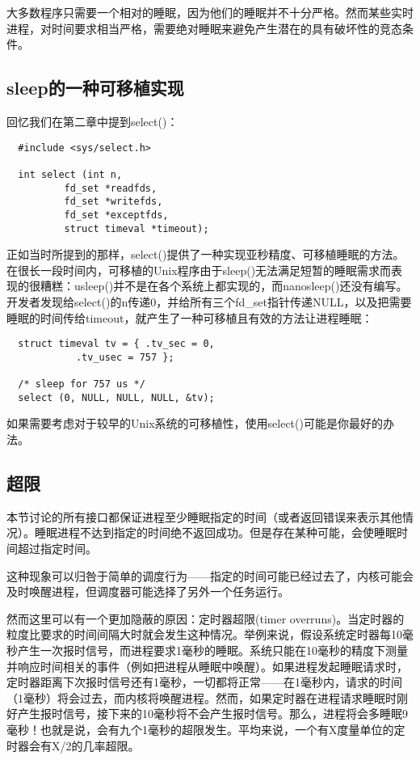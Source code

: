 大多数程序只需要一个相对的睡眠，因为他们的睡眠并不十分严格。然而某些实时进程，对时间要求相当严格，需要绝对睡眠来避免产生潜在的具有破坏性的竞态条件。 

\subsection{sleep的一种可移植实现}

回忆我们在第二章中提到select()： 

\begin{lstlisting}
  #include <sys/select.h>

  int select (int n,
	      fd_set *readfds,
	      fd_set *writefds,
	      fd_set *exceptfds,
	      struct timeval *timeout);
\end{lstlisting}

正如当时所提到的那样，select()提供了一种实现亚秒精度、可移植睡眠的方法。在很长一段时间内，可移植的Unix程序由于sleep()无法满足短暂的睡眠需求而表现的很糟糕：usleep()并不是在各个系统上都实现的，而nanosleep()还没有编写。开发者发现给select()的n传递0，并给所有三个fd\_set指针传递NULL，以及把需要睡眠的时间传给timeout，就产生了一种可移植且有效的方法让进程睡眠： 

\begin{lstlisting}
  struct timeval tv = { .tv_sec = 0,
			.tv_usec = 757 };

  /* sleep for 757 us */
  select (0, NULL, NULL, NULL, &tv);
\end{lstlisting}

如果需要考虑对于较早的Unix系统的可移植性，使用select()可能是你最好的办法。 

\subsection{超限}

本节讨论的所有接口都保证进程至少睡眠指定的时间（或者返回错误来表示其他情况）。睡眠进程不达到指定的时间绝不返回成功。但是存在某种可能，会使睡眠时间超过指定时间。

这种现象可以归咎于简单的调度行为——指定的时间可能已经过去了，内核可能会及时唤醒进程，但调度器可能选择了另外一个任务运行。

然而这里可以有一个更加隐蔽的原因：定时器超限(timer overruns)。当定时器的粒度比要求的时间间隔大时就会发生这种情况。举例来说，假设系统定时器每10毫秒产生一次报时信号，而进程要求1毫秒的睡眠。系统只能在10毫秒的精度下测量并响应时间相关的事件（例如把进程从睡眠中唤醒）。如果进程发起睡眠请求时，定时器距离下次报时信号还有1毫秒，一切都将正常——在1毫秒内，请求的时间（1毫秒）将会过去，而内核将唤醒进程。然而，如果定时器在进程请求睡眠时刚好产生报时信号，接下来的10毫秒将不会产生报时信号。那么，进程将会多睡眠9毫秒！也就是说，会有九个1毫秒的超限发生。平均来说，一个有X度量单位的定时器会有X/2的几率超限。

